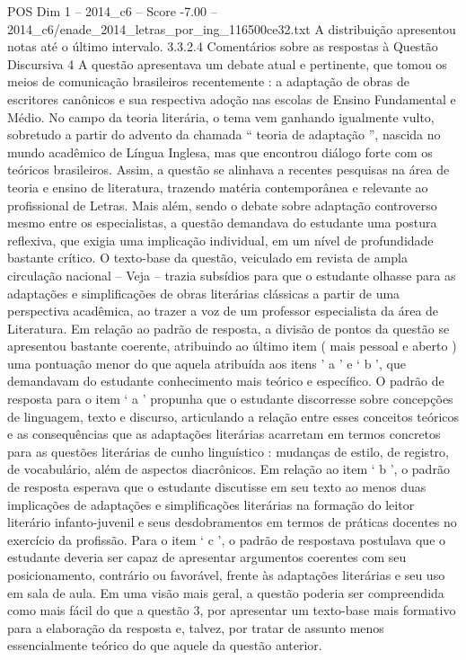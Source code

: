 \begin{textsample}{POS Dim 1 – 2014\_c6 – Score -7.00 – 2014\_c6/enade\_2014\_letras\_por\_ing\_116500ce32.txt}
A distribuição apresentou notas até o último intervalo. 3.3.2.4 Comentários sobre as respostas à Questão Discursiva 4 A questão apresentava um debate atual e pertinente, que tomou os meios de comunicação brasileiros recentemente : a adaptação de obras de escritores canônicos e sua respectiva adoção nas escolas de Ensino Fundamental e Médio.
No campo da teoria literária, o tema vem ganhando igualmente vulto, sobretudo a partir do advento da chamada “ teoria de adaptação ”, nascida no mundo acadêmico de Língua Inglesa, mas que encontrou diálogo forte com os teóricos brasileiros.
Assim, a questão se alinhava a recentes pesquisas na área de teoria e ensino de literatura, trazendo matéria contemporânea e relevante ao profissional de Letras.
Mais além, sendo o debate sobre adaptação controverso mesmo entre os especialistas, a questão demandava do estudante uma postura reflexiva, que exigia uma implicação individual, em um nível de profundidade bastante crítico.
O texto-base da questão, veiculado em revista de ampla circulação nacional – Veja – trazia subsídios para que o estudante olhasse para as adaptações e simplificações de obras literárias clássicas a partir de uma perspectiva acadêmica, ao trazer a voz de um professor especialista da área de Literatura.
Em relação ao padrão de resposta, a divisão de pontos da questão se apresentou bastante coerente, atribuindo ao último item ( mais pessoal e aberto ) uma pontuação menor do que aquela atribuída aos itens ’ a ’ e ‘ b ’, que demandavam do estudante conhecimento mais teórico e específico.
O padrão de resposta para o item ‘ a ’ propunha que o estudante discorresse sobre concepções de linguagem, texto e discurso, articulando a relação entre esses conceitos teóricos e as consequências que as adaptações literárias acarretam em termos concretos para as questões literárias de cunho linguístico : mudanças de estilo, de registro, de vocabulário, além de aspectos diacrônicos.
Em relação ao item ‘ b ’, o padrão de resposta esperava que o estudante discutisse em seu texto ao menos duas implicações de adaptações e simplificações literárias na formação do leitor literário infanto-juvenil e seus desdobramentos em termos de práticas docentes no exercício da profissão.
Para o item ‘ c ’, o padrão de respostava postulava que o estudante deveria ser capaz de apresentar argumentos coerentes com seu posicionamento, contrário ou favorável, frente às adaptações literárias e seu uso em sala de aula.
Em uma visão mais geral, a questão poderia ser compreendida como mais fácil do que a questão 3, por apresentar um texto-base mais formativo para a elaboração da resposta e, talvez, por tratar de assunto menos essencialmente teórico do que aquele da questão anterior.

\end{textsample}
